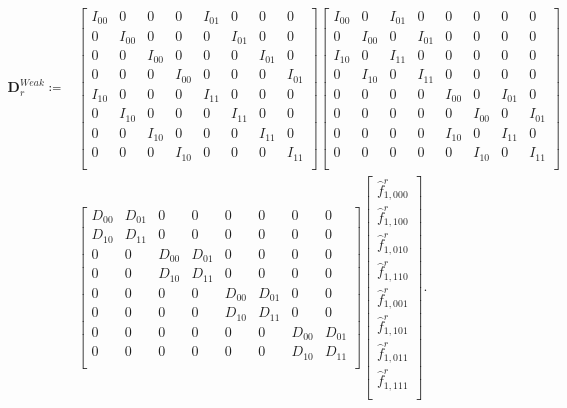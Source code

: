 \documentclass[12pt,Bold,letterpaper,TexShade]{mcgilletdclass}
\numberwithin{equation}{section}
\begin{document}
\begin{equation} \nonumber
\begin{split}
\boldsymbol D^{Weak}_r 
\coloneqq &
\begin{bmatrix}
I_{00} & 0 & 0 & 0 & I_{01} & 0 & 0 & 0 \\
0 & I_{00} & 0 & 0 & 0 & I_{01} & 0 & 0 \\
0 & 0 & I_{00} & 0 & 0 & 0 & I_{01} & 0 \\
0 & 0 & 0 & I_{00} & 0 & 0 & 0 & I_{01} \\
I_{10} & 0 & 0 & 0 & I_{11} & 0 & 0 & 0 \\
0 & I_{10} & 0 & 0 & 0 & I_{11} & 0 & 0 \\
0 & 0 & I_{10} & 0 & 0 & 0 & I_{11} & 0 \\
0 & 0 & 0 & I_{10} & 0 & 0 & 0 & I_{11} \\
\end{bmatrix}
\begin{bmatrix}
I_{00} & 0 & I_{01} & 0 & 0 & 0 & 0 & 0 \\
0 & I_{00} & 0 & I_{01} & 0 & 0 & 0 & 0 \\
I_{10} & 0 & I_{11} & 0 & 0 & 0 & 0 & 0 \\
0 & I_{10} & 0 & I_{11} & 0 & 0 & 0 & 0 \\
0 & 0 & 0 & 0 & I_{00} & 0 & I_{01} & 0 \\
0 & 0 & 0 & 0 & 0 & I_{00} & 0 & I_{01} \\
0 & 0 & 0 & 0 & I_{10} & 0 & I_{11} & 0 \\
0 & 0 & 0 & 0 & 0 & I_{10} & 0 & I_{11} \\
\end{bmatrix} \\
&
\begin{bmatrix}
D_{00} & D_{01} & 0 & 0 & 0 & 0 & 0 & 0 \\
D_{10} & D_{11} & 0 & 0 & 0 & 0 & 0 & 0 \\
0 & 0 & D_{00} & D_{01} & 0 & 0 & 0 & 0 \\
0 & 0 & D_{10} & D_{11} & 0 & 0 & 0 & 0 \\
0 & 0 & 0 & 0 & D_{00} & D_{01} & 0 & 0 \\
0 & 0 & 0 & 0 & D_{10} & D_{11} & 0 & 0 \\
0 & 0 & 0 & 0 & 0 & 0 & D_{00} & D_{01} \\
0 & 0 & 0 & 0 & 0 & 0 & D_{10} & D_{11} \\
\end{bmatrix}
\begin{bmatrix}
\hat{f}^r_{1,000} \\
\hat{f}^r_{1,100} \\
\hat{f}^r_{1,010} \\
\hat{f}^r_{1,110} \\
\hat{f}^r_{1,001} \\
\hat{f}^r_{1,101} \\
\hat{f}^r_{1,011} \\
\hat{f}^r_{1,111} \\
\end{bmatrix}.
\end{split}
\end{equation}
\end{document}
